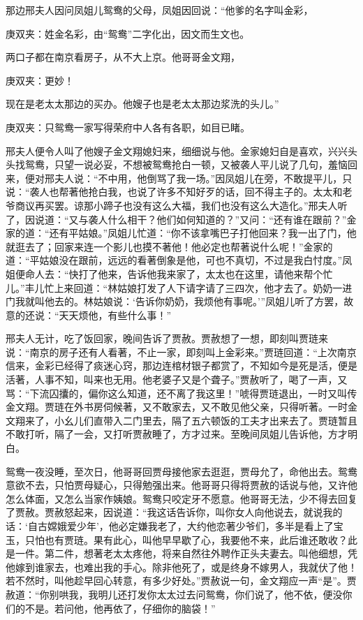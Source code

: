 \begin{parag}
    那边邢夫人因问凤姐儿鸳鸯的父母，凤姐因回说：“他爹的名字叫金彩，\begin{note}庚双夹：姓金名彩，由“鸳鸯”二字化出，因文而生文也。\end{note}两口子都在南京看房子，从不大上京。他哥哥金文翔，\begin{note}庚双夹：更妙！\end{note}现在是老太太那边的买办。他嫂子也是老太太那边浆洗的头儿。”\begin{note}庚双夹：只鸳鸯一家写得荣府中人各有各职，如目已睹。\end{note}邢夫人便令人叫了他嫂子金文翔媳妇来，细细说与他。金家媳妇自是喜欢，兴兴头头找鸳鸯，只望一说必妥，不想被鸳鸯抢白一顿，又被袭人平儿说了几句，羞恼回来，便对邢夫人说：“不中用，他倒骂了我一场。”因凤姐儿在旁，不敢提平儿，只说：“袭人也帮著他抢白我，也说了许多不知好歹的话，回不得主子的。太太和老爷商议再买罢。谅那小蹄子也没有这么大福，我们也没有这么大造化。”邢夫人听了，因说道：“又与袭人什么相干？他们如何知道的？”又问：“还有谁在跟前？”金家的道：“还有平姑娘。”凤姐儿忙道：“你不该拿嘴巴子打他回来？我一出了门，他就逛去了；回家来连一个影儿也摸不著他！他必定也帮著说什么呢！”金家的道：“平姑娘没在跟前，远远的看著倒象是他，可也不真切，不过是我白忖度。”凤姐便命人去：“快打了他来，告诉他我来家了，太太也在这里，请他来帮个忙儿。”丰儿忙上来回道：“林姑娘打发了人下请字请了三四次，他才去了。奶奶一进门我就叫他去的。林姑娘说：‘告诉你奶奶，我烦他有事呢。’”凤姐儿听了方罢，故意的还说：“天天烦他，有些什么事！”
\end{parag}


\begin{parag}
    邢夫人无计，吃了饭回家，晚间告诉了贾赦。贾赦想了一想，即刻叫贾琏来说：“南京的房子还有人看著，不止一家，即刻叫上金彩来。”贾琏回道：“上次南京信来，金彩已经得了痰迷心窍，那边连棺材银子都赏了，不知如今是死是活，便是活著，人事不知，叫来也无用。他老婆子又是个聋子。”贾赦听了，喝了一声，又骂：“下流囚攮的，偏你这么知道，还不离了我这里！”唬得贾琏退出，一时又叫传金文翔。贾琏在外书房伺候著，又不敢家去，又不敢见他父亲，只得听著。一时金文翔来了，小幺儿们直带入二门里去，隔了五六顿饭的工夫才出来去了。贾琏暂且不敢打听，隔了一会，又打听贾赦睡了，方才过来。至晚间凤姐儿告诉他，方才明白。
\end{parag}


\begin{parag}
    鸳鸯一夜没睡，至次日，他哥哥回贾母接他家去逛逛，贾母允了，命他出去。鸳鸯意欲不去，只怕贾母疑心，只得勉强出来。他哥哥只得将贾赦的话说与他，又许他怎么体面，又怎么当家作姨娘。鸳鸯只咬定牙不愿意。他哥哥无法，少不得去回复了贾赦。贾赦怒起来，因说道：“我这话告诉你，叫你女人向他说去，就说我的话：‘自古嫦娥爱少年’，他必定嫌我老了，大约他恋著少爷们，多半是看上了宝玉，只怕也有贾琏。果有此心，叫他早早歇了心，我要他不来，此后谁还敢收？此是一件。第二件，想著老太太疼他，将来自然往外聘作正头夫妻去。叫他细想，凭他嫁到谁家去，也难出我的手心。除非他死了，或是终身不嫁男人，我就伏了他！若不然时，叫他趁早回心转意，有多少好处。”贾赦说一句，金文翔应一声“是”。贾赦道：“你别哄我，我明儿还打发你太太过去问鸳鸯，你们说了，他不依，便没你们的不是。若问他，他再依了，仔细你的脑袋！”
\end{parag}


